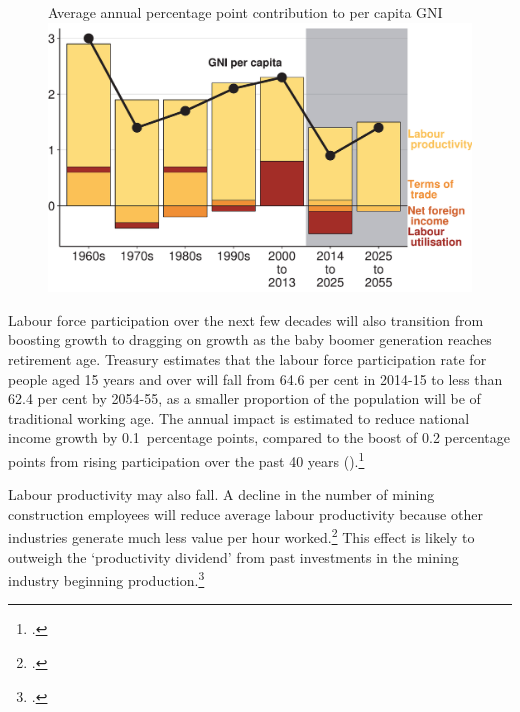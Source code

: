 \documentclass[twoside,english]{grattanBudgetRepairb5portrait}
\begin{document}
\begin{figure}[!t]
%
{Average annual percentage point contribution to per capita GNI}
\includegraphics[width=\columnwidth]{Fiscal-challenges/figure/Figure5-1.pdf}

\end{figure} 

Labour force participation over the next few decades will also transition from boosting growth to dragging on growth as the baby boomer generation reaches retirement age. Treasury estimates that the labour force participation rate for people aged 15 years and over will fall from 64.6 per cent in 2014-15 to less than 62.4 per cent by 2054-55, as a smaller proportion of the population will be of traditional working age.  The annual impact is estimated to reduce national income growth by 0.1~percentage points, compared to the boost of 0.2 percentage points from rising participation over the past 40 years ().\footcite[][pp.~ix,xi]{Hockey2015IGR}  

Labour productivity may also fall. A decline in the number of mining construction employees will reduce average labour productivity because other industries generate much less value per hour worked.\footcite{Borland2014}  This effect is likely to outweigh the ‘productivity dividend’ from past investments in the mining industry beginning production.\footcite[][12]{Commission2014} 
\end{document}
